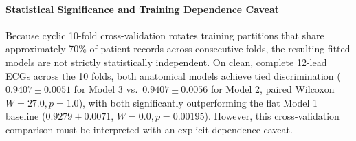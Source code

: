 \documentclass[12pt]{elsarticle}
\begin{document}
\begin{table}[t]
\caption{Cyclic 10-Fold Stratified Cross-Validation Benchmark Results on PTB-XL ($N = 21,799$ Records). Values report Mean $\pm$ Std [95\% CI] across the 10 rotated test folds.}
\label{tab:10fold_results}
\centering
\small
\setlength{\tabcolsep}{4.5pt}
\end{table}

\paragraph{Statistical Significance and Training Dependence Caveat}
Because cyclic 10-fold cross-validation rotates training partitions that share approximately 70\% of patient records across consecutive folds, the resulting fitted models are not strictly statistically independent. On clean, complete 12-lead ECGs across the 10 folds, both anatomical models achieve tied discrimination ($0.9407 \pm 0.0051$ for Model 3 vs.\ $0.9407 \pm 0.0056$ for Model 2, paired Wilcoxon $W = 27.0, p = 1.0$), with both significantly outperforming the flat Model 1 baseline ($0.9279 \pm 0.0071$, $W = 0.0, p = 0.00195$). However, this cross-validation comparison must be interpreted with an explicit dependence caveat. 
\end{document}

